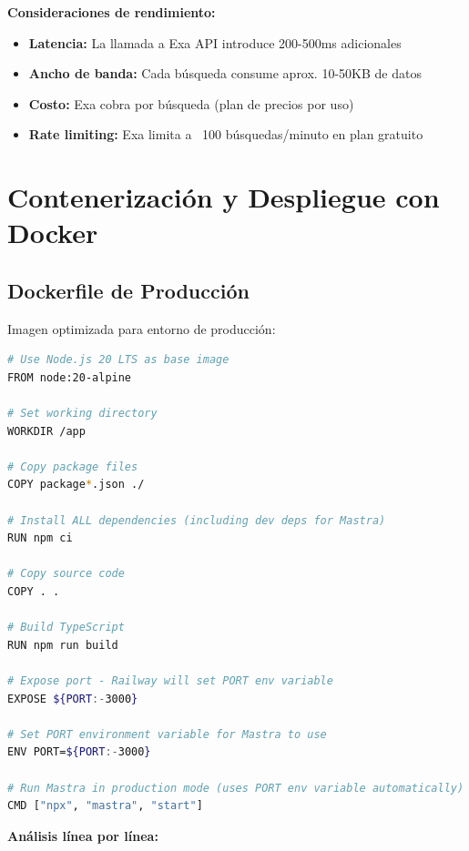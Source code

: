 \documentclass[12pt,a4paper]{article}
\begin{document}
\textbf{Consideraciones de rendimiento:}

\begin{itemize}
    \item \textbf{Latencia:} La llamada a Exa API introduce 200-500ms adicionales
    \item \textbf{Ancho de banda:} Cada búsqueda consume aprox. 10-50KB de datos
    \item \textbf{Costo:} Exa cobra por búsqueda (plan de precios por uso)
    \item \textbf{Rate limiting:} Exa limita a ~100 búsquedas/minuto en plan gratuito
\end{itemize}

\newpage

\section{Contenerización y Despliegue con Docker}

\subsection{Dockerfile de Producción}

Imagen optimizada para entorno de producción:

\begin{lstlisting}[language=bash, caption=Dockerfile - Imagen de Producción]
# Use Node.js 20 LTS as base image
FROM node:20-alpine

# Set working directory
WORKDIR /app

# Copy package files
COPY package*.json ./

# Install ALL dependencies (including dev deps for Mastra)
RUN npm ci

# Copy source code
COPY . .

# Build TypeScript
RUN npm run build

# Expose port - Railway will set PORT env variable
EXPOSE ${PORT:-3000}

# Set PORT environment variable for Mastra to use
ENV PORT=${PORT:-3000}

# Run Mastra in production mode (uses PORT env variable automatically)
CMD ["npx", "mastra", "start"]
\end{lstlisting}

\textbf{Análisis línea por línea:}
\end{document}
